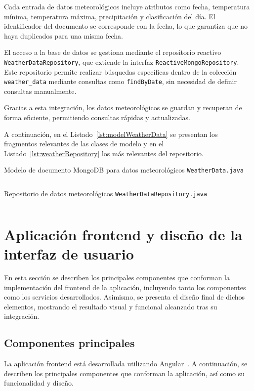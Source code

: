 Cada entrada de datos meteorológicos incluye atributos como fecha, temperatura mínima, temperatura máxima, precipitación y clasificación del día. El identificador del documento se corresponde con la fecha, lo que garantiza que no haya duplicados para una misma fecha.

El acceso a la base de datos se gestiona mediante el repositorio reactivo \texttt{WeatherDataRepository}, que extiende la interfaz \texttt{ReactiveMongoRepository}. Este repositorio permite realizar búsquedas específicas dentro de la colección \texttt{weather\_data} mediante consultas como \texttt{findByDate}, sin necesidad de definir consultas manualmente.

Gracias a esta integración, los datos meteorológicos se guardan y recuperan de forma eficiente, permitiendo consultas rápidas y actualizadas.

A continuación, en el Listado~\ref{lst:modelWeatherData} se presentan los fragmentos relevantes de las clases de modelo y en el Listado~\ref{lst:weatherRepository} los más relevantes del repositorio.

\begin{longlisting} \caption{Modelo de documento MongoDB para datos meteorológicos {\tt WeatherData.java}} \inputminted[firstline=6]{java}{../backend/tiempo/tiempo/src/main/java/hemal/uv/es/tiempo/domain/WeatherData.java} \label{lst:modelWeatherData} \end{longlisting}

\begin{longlisting} \caption{Repositorio de datos meteorológicos {\tt WeatherDataRepository.java}} \inputminted{java}{../backend/tiempo/tiempo/src/main/java/hemal/uv/es/tiempo/repositories/WeatherDataRepository.java} \label{lst:weatherRepository} \end{longlisting}

\section{Aplicación \gls{frontend} y diseño de la interfaz de usuario}
En esta sección se describen los principales componentes que conforman la implementación del \gls{frontend} de la aplicación, incluyendo tanto los componentes como los servicios desarrollados. Asimismo, se presenta el diseño final de dichos elementos, mostrando el resultado visual y funcional alcanzado tras su integración.
\subsection{Componentes principales}
La aplicación \gls{frontend} está desarrollada utilizando Angular~\cite{angular}. A continuación, se describen los principales componentes que conforman la aplicación, así como su funcionalidad y diseño.

